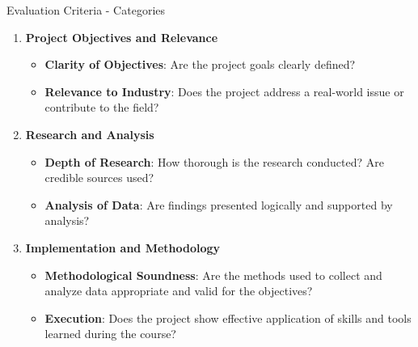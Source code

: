 \documentclass[aspectratio=169]{beamer}
\begin{document}
\begin{frame}[fragile]{Evaluation Criteria - Categories}
  \begin{enumerate}
    \item \textbf{Project Objectives and Relevance}
      \begin{itemize}
        \item \textbf{Clarity of Objectives}: Are the project goals clearly defined?
        \item \textbf{Relevance to Industry}: Does the project address a real-world issue or contribute to the field?
      \end{itemize}
    \item \textbf{Research and Analysis}
      \begin{itemize}
        \item \textbf{Depth of Research}: How thorough is the research conducted? Are credible sources used?
        \item \textbf{Analysis of Data}: Are findings presented logically and supported by analysis?
      \end{itemize}
    \item \textbf{Implementation and Methodology}
      \begin{itemize}
        \item \textbf{Methodological Soundness}: Are the methods used to collect and analyze data appropriate and valid for the objectives?
        \item \textbf{Execution}: Does the project show effective application of skills and tools learned during the course?
      \end{itemize}
  \end{enumerate}
\end{frame}
\end{document}
